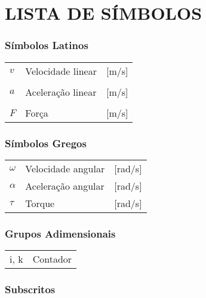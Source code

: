 




\chapter*{LISTA DE SÍMBOLOS}


\subsection*{Símbolos Latinos}

\begin{tabular}{p{}p{}>{\PreserveBacklash\raggedleft}p{}}
$v$  & Velocidade linear  & {[}m/s{]}\tabularnewline\\
$a$  & Aceleração linear  & {[}m/s{]}\tabularnewline\\
$F$  & Força  & {[}m/s{]}\tabularnewline
\end{tabular}


\subsection*{Símbolos Gregos}

\begin{tabular}{p{}p{}>{\PreserveBacklash\raggedleft}p{}}
$\omega$ & Velocidade angular & {[}rad/s{]}\tabularnewline
$\alpha$ & Aceleração angular & {[}rad/s{]}\tabularnewline
$\tau$ & Torque & {[}rad/s{]}\tabularnewline
\end{tabular}


\subsection*{Grupos Adimensionais}

\begin{tabular}{p{}p{}}
i, k & Contador\tabularnewline
\end{tabular}


\subsection*{Subscritos}

